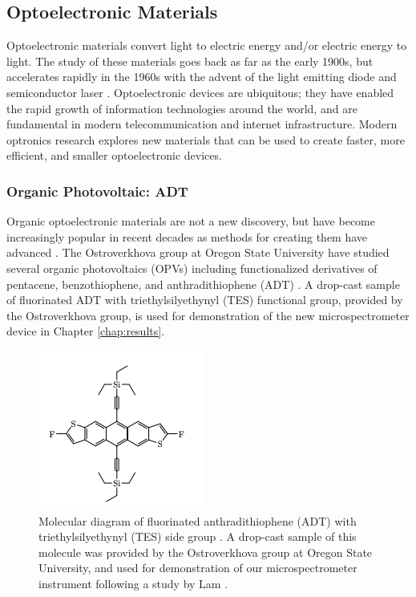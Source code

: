 \subsection{Optoelectronic Materials}

Optoelectronic materials convert light to electric energy and/or electric energy to light. The study of these materials goes back as far as the early 1900s, but accelerates rapidly in the 1960s with the advent of the light emitting diode and semiconductor laser \cite{sweeney_optoelectronic_2017}. Optoelectronic devices are ubiquitous; they have enabled the rapid growth of information technologies around the world, and are fundamental in modern telecommunication and internet infrastructure. Modern optronics research explores new materials that can be used to create faster, more efficient, and smaller optoelectronic devices.

\subsubsection{Organic Photovoltaic: ADT}

Organic optoelectronic materials are not a new discovery, but have become increasingly popular in recent decades as methods for creating them have advanced \cite{ostroverkhova_organic_2016}. The Ostroverkhova group at Oregon State University have studied several organic photovoltaics (OPVs) including functionalized derivatives of pentacene, benzothiophene, and anthradithiophene (ADT) \cite{shepherd_optical_2010}\cite{e._b._shepherd_effect_2011}\cite{platt_optical_2009}. A drop-cast sample of fluorinated ADT with triethylsilyethynyl (TES) functional group, provided by the Ostroverkhova group, is used for demonstration of the new microspectrometer device in Chapter \ref{chap:results}.

\begin{figure}[H]
    \centering
    \includegraphics{img/adt-tes-f.png}
    \caption[Molecular diagram of ADT TES-F.]{Molecular diagram of fluorinated anthradithiophene (ADT) with triethylsilyethynyl (TES) side group \cite{shepherd_optical_2010}. A drop-cast sample of this molecule was provided by the Ostroverkhova group at Oregon State University, and used for demonstration of our microspectrometer instrument following a study by Lam \cite{lam_polarization_2018}.}
    \label{fig:adt-diagram}
\end{figure}

